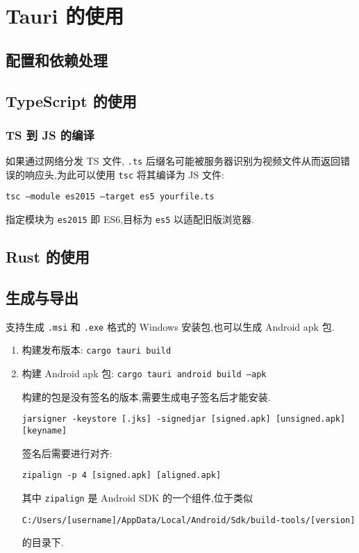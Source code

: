 
\usepackage{../../lectures_preamble}


    \section{Tauri 的使用}
        \subsection{配置和依赖处理}
        \subsection{TypeScript 的使用}
        \subsubsection{TS 到 JS 的编译}
        如果通过网络分发 TS 文件, \texttt{.ts} 后缀名可能被服务器识别为视频文件从而返回错误的响应头,为此可以使用 \texttt{tsc} 将其编译为 JS 文件:

        \texttt{tsc ---module es2015 ---target es5 yourfile.ts}

        指定模块为 \texttt{es2015} 即 ES6,目标为 \texttt{es5} 以适配旧版浏览器.
        \subsection{Rust 的使用}
        \subsection{生成与导出}
            支持生成 \texttt{.msi} 和 \texttt{.exe} 格式的 Windows 安装包,也可以生成 Android apk 包.

            \begin{enumerate}
                \item 构建发布版本: \texttt{cargo tauri build}
                \item 构建 Android apk 包: \texttt{cargo tauri android build --apk}

                    构建的包是没有签名的版本,需要生成电子签名后才能安装.

                    \texttt{jarsigner -keystore [.jks] -signedjar [signed.apk] [unsigned.apk] [keyname]}

                    签名后需要进行对齐:

                    \texttt{zipalign -p 4 [signed.apk] [aligned.apk]}

                    其中 \texttt{zipalign} 是 Android SDK 的一个组件,位于类似
                    
                    \texttt{C:/Users/[username]/AppData/Local/Android/Sdk/build-tools/[version]}

                    的目录下.
            \end{enumerate}
